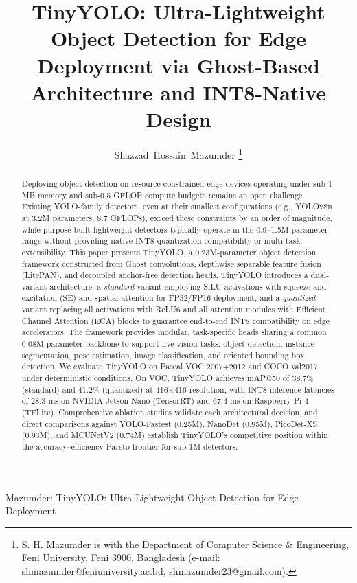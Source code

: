 \documentclass[journal]{IEEEtran}
\begin{document}
\title{TinyYOLO: Ultra-Lightweight Object Detection for Edge Deployment via Ghost-Based Architecture and INT8-Native Design}

\author{Shazzad~Hossain~Mazumder
\thanks{S. H. Mazumder is with the Department of Computer Science \& Engineering, Feni University, Feni 3900, Bangladesh (e-mail: shmazumder@feniuniversity.ac.bd, shmazumder23@gmail.com).}}

%
{Mazumder: TinyYOLO: Ultra-Lightweight Object Detection for Edge Deployment}

\maketitle

\begin{abstract}
Deploying object detection on resource-constrained edge devices operating under sub-1 MB memory and sub-0.5 GFLOP compute budgets remains an open challenge. Existing YOLO-family detectors, even at their smallest configurations (e.g., YOLOv8n at 3.2M parameters, 8.7 GFLOPs), exceed these constraints by an order of magnitude, while purpose-built lightweight detectors typically operate in the 0.9--1.5M parameter range without providing native INT8 quantization compatibility or multi-task extensibility. This paper presents TinyYOLO, a 0.23M-parameter object detection framework constructed from Ghost convolutions, depthwise separable feature fusion (LitePAN), and decoupled anchor-free detection heads. TinyYOLO introduces a dual-variant architecture: a \textit{standard} variant employing SiLU activations with squeeze-and-excitation (SE) and spatial attention for FP32/FP16 deployment, and a \textit{quantized} variant replacing all activations with ReLU6 and all attention modules with Efficient Channel Attention (ECA) blocks to guarantee end-to-end INT8 compatibility on edge accelerators. The framework provides modular, task-specific heads sharing a common 0.08M-parameter backbone to support five vision tasks: object detection, instance segmentation, pose estimation, image classification, and oriented bounding box detection. We evaluate TinyYOLO on Pascal VOC 2007+2012 and COCO val2017 under deterministic conditions. On VOC, TinyYOLO achieves mAP@50 of 38.7\% (standard) and 41.2\% (quantized) at 416$\times$416 resolution, with INT8 inference latencies of 28.3 ms on NVIDIA Jetson Nano (TensorRT) and 67.4 ms on Raspberry Pi 4 (TFLite). Comprehensive ablation studies validate each architectural decision, and direct comparisons against YOLO-Fastest (0.25M), NanoDet (0.95M), PicoDet-XS (0.93M), and MCUNetV2 (0.74M) establish TinyYOLO's competitive position within the accuracy--efficiency Pareto frontier for sub-1M detectors.
\end{abstract}
\end{document}
